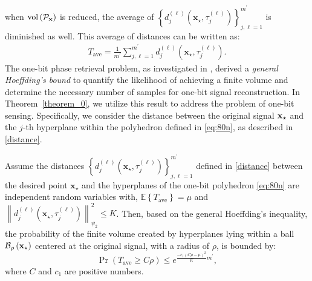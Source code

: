 \documentclass[12pt,draftcls,onecolumn]{IEEEtran}
\newcommand{\Fr}[1]{\textcolor{blue}{#1}}
\begin{document}
when $\operatorname{vol}\left(\mathcal{P}_{\mathbf{x}}\right)$ is reduced,
the average of $\left\{d^{(\ell)}_{j}\left(\mathbf{x}_{\star},\tau_{j}^{(\ell)}\right)\right\}_{j,\ell=1}^{m^{\prime}}$ is diminished as well. This average of distances can be written as:
\begin{equation}
\label{ave}
\begin{aligned}
T_{\mathrm{ave}}=\frac{1}{m^{\prime}}\sum^{m^{\prime}}_{j,\ell=1}d^{(\ell)}_{j}\left(\mathbf{x}_{\star},\tau_{j}^{(\ell)}\right).
\end{aligned}
\end{equation}\normalsize
The one-bit phase retrieval problem, as investigated in \cite{eamaz2022phase}, derived a \emph{general Hoeffding's bound} \cite[Theorem~2.6.2]{vershynin2018high} to quantify the likelihood of achieving a finite volume and determine the necessary number of samples for one-bit signal reconstruction. In Theorem~\ref{theorem_0}, we utilize this result to address the problem of one-bit sensing. Specifically, we consider the distance between the original signal $\mathbf{x}_{\star}$ and the $j$-th hyperplane within the polyhedron defined in \eqref{eq:80n}, as described in \eqref{distance}.
\begin{theorem}
\label{theorem_0}
Assume the distances $\left\{d^{(\ell)}_{j}\left(\mathbf{x}_{\star},\tau^{(\ell)}_{j}\right)\right\}_{j,\ell=1}^{m^{\prime}}$ defined in \eqref{distance} between the desired point $\mathbf{x}_{\star}$ and the hyperplanes of the one-bit polyhedron \eqref{eq:80n} 
are %
independent random variables with,
$\mathbb{E}\left\{T_{\mathrm{ave}}\right\}=\mu$ and $\left\|d^{(\ell)}_{j}\left(\mathbf{x}_{\star},\tau^{(\ell)}_{j}\right)\right\|_{\psi_{2}}^{2}\leq K$.
Then, based on the general Hoeffding's inequality, the probability of the finite volume created by hyperplanes lying within a ball $\mathcal{B}_\rho\left(\mathbf{x}_{\star}\right)$ centered at the original signal, with a radius of $\rho$, is bounded by:
\begin{equation}
\label{eq:theorem_cher}
\operatorname{Pr}\left(T_{\mathrm{ave}}\geq C \rho\right)\leq e^{\frac{-c_1\left(C\rho-\mu\right)^{2}}{K}m^{\prime}},
\end{equation}
where $C$ and $c_1$ are positive numbers. 
\end{theorem}
\end{document}
